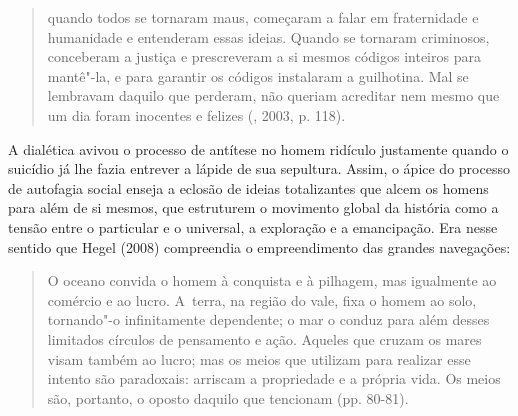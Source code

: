 \begin{quote}
quando todos se tornaram maus, começaram a falar em fraternidade e
humanidade e entenderam essas ideias. Quando se tornaram criminosos,
conceberam a justiça e prescreveram a si mesmos códigos inteiros para
mantê"-la, e para garantir os códigos instalaram a guilhotina. Mal se
lembravam daquilo que perderam, não queriam acreditar nem mesmo que um
dia foram inocentes e felizes (, 2003, p. 118).
\end{quote}

A dialética avivou o processo de antítese no homem ridículo justamente
quando o suicídio já lhe fazia entrever a lápide de sua sepultura.
Assim, o ápice do processo de autofagia social enseja a eclosão de
ideias totalizantes que alcem os homens para além de si mesmos, que
estruturem o movimento global da história como a tensão entre o
particular e o universal, a exploração e a emancipação. Era nesse
sentido que Hegel (2008) compreendia o empreendimento das grandes
navegações:

\begin{quote}
O oceano convida o homem à conquista e à pilhagem, mas igualmente ao
comércio e ao lucro. A~terra, na região do vale, fixa o homem ao solo,
tornando"-o infinitamente dependente; o mar o conduz para além desses
limitados círculos de pensamento e ação. Aqueles que cruzam os mares
visam também ao lucro; mas os meios que utilizam para realizar esse
intento são paradoxais: arriscam a propriedade e a própria vida. Os
meios são, portanto, o oposto daquilo que tencionam (pp. 80-81).
\end{quote}

